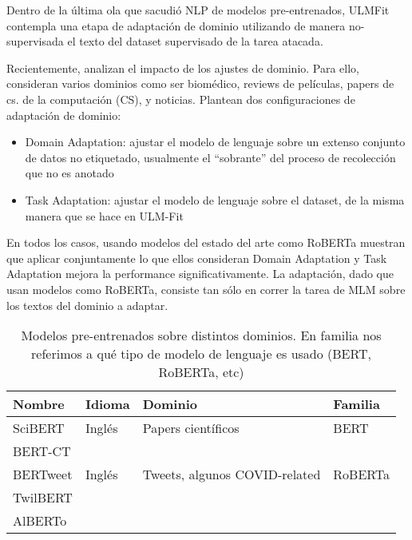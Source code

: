 Dentro de la última ola que sacudió NLP de modelos pre-entrenados, ULMFit \citet{howard-ruder-2018-universal} contempla una etapa de adaptación de dominio utilizando de manera no-supervisada el texto del dataset supervisado de la tarea atacada.

Recientemente, \citet{gururangan-etal-2020-dont} analizan el impacto de los ajustes de dominio. Para ello, consideran varios dominios como ser biomédico, reviews de películas, papers de cs. de la computación (CS), y noticias. Plantean dos configuraciones de adaptación de dominio:

\begin{itemize}
    \item Domain Adaptation: ajustar el modelo de lenguaje sobre un extenso conjunto de datos no etiquetado, usualmente el ``sobrante'' del proceso de recolección que no es anotado
    \item Task Adaptation: ajustar el modelo de lenguaje sobre el dataset, de la misma manera que se hace en ULM-Fit
\end{itemize}

En todos los casos, usando modelos del estado del arte como RoBERTa muestran que aplicar conjuntamente lo que ellos consideran Domain Adaptation y Task Adaptation mejora la performance significativamente. La adaptación, dado que usan modelos como RoBERTa, consiste tan sólo en correr la tarea de MLM sobre los textos del dominio a adaptar.

\begin{table}
    \centering
    \begin{tabular}{llll}
        Nombre                                 & Idioma            & Dominio                          & Familia     \\
        \hline
        SciBERT\cite{beltagy-etal-2019-scibert}& Inglés            & Papers científicos               & BERT        \\
        BERT-CT                                &                   &                                  &             \\
        BERTweet\cite{bertweet}                & Inglés            & Tweets, algunos COVID-related    & RoBERTa     \\
        TwilBERT                               &                   &                                  &             \\
        AlBERTo                                &                   &                                  &             \\
    \end{tabular}

    \caption{Modelos pre-entrenados sobre distintos dominios. En familia nos referimos a qué tipo de modelo de lenguaje es usado (BERT, RoBERTa, etc)}
    \label{tab:bert_pretrained_models}
\end{table}


